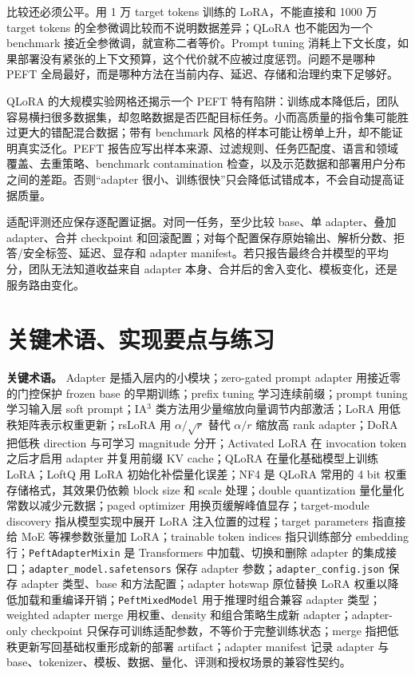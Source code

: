 \documentclass[UTF8,zihao=-4,openany]{ctexbook}
\begin{document}
比较还必须公平。用 1 万 target tokens 训练的 LoRA，不能直接和 1000 万 target tokens 的全参微调比较而不说明数据差异；QLoRA 也不能因为一个 benchmark 接近全参微调，就宣称二者等价。Prompt tuning 消耗上下文长度，如果部署没有紧张的上下文预算，这个代价就不应被过度惩罚。问题不是哪种 PEFT 全局最好，而是哪种方法在当前内存、延迟、存储和治理约束下足够好。

QLoRA 的大规模实验网格还揭示一个 PEFT 特有陷阱：训练成本降低后，团队容易横扫很多数据集，却忽略数据是否匹配目标任务。小而高质量的指令集可能胜过更大的错配混合数据；带有 benchmark 风格的样本可能让榜单上升，却不能证明真实泛化。PEFT 报告应写出样本来源、过滤规则、任务匹配度、语言和领域覆盖、去重策略、benchmark contamination 检查，以及示范数据和部署用户分布之间的差距。否则“adapter 很小、训练很快”只会降低试错成本，不会自动提高证据质量。

适配评测还应保存逐配置证据。对同一任务，至少比较 base、单 adapter、叠加 adapter、合并 checkpoint 和回滚配置；对每个配置保存原始输出、解析分数、拒答/安全标签、延迟、显存和 adapter manifest。若只报告最终合并模型的平均分，团队无法知道收益来自 adapter 本身、合并后的舍入变化、模板变化，还是服务路由变化。

\section{关键术语、实现要点与练习}
\textbf{关键术语。} Adapter 是插入层内的小模块；zero-gated prompt adapter 用接近零的门控保护 frozen base 的早期训练；prefix tuning 学习连续前缀；prompt tuning 学习输入层 soft prompt；IA$^3$ 类方法用少量缩放向量调节内部激活；LoRA 用低秩矩阵表示权重更新；rsLoRA 用 $\alpha/\sqrt r$ 替代 $\alpha/r$ 缩放高 rank adapter；DoRA 把低秩 direction 与可学习 magnitude 分开；Activated LoRA 在 invocation token 之后才启用 adapter 并复用前缀 KV cache；QLoRA 在量化基础模型上训练 LoRA；LoftQ 用 LoRA 初始化补偿量化误差；NF4 是 QLoRA 常用的 4 bit 权重存储格式，其效果仍依赖 block size 和 scale 处理；double quantization 量化量化常数以减少元数据；paged optimizer 用换页缓解峰值显存；target-module discovery 指从模型实现中展开 LoRA 注入位置的过程；target parameters 指直接给 MoE 等裸参数张量加 LoRA；trainable token indices 指只训练部分 embedding 行；\texttt{PeftAdapterMixin} 是 Transformers 中加载、切换和删除 adapter 的集成接口；\texttt{adapter\_model.safetensors} 保存 adapter 参数；\texttt{adapter\_config.json} 保存 adapter 类型、base 和方法配置；adapter hotswap 原位替换 LoRA 权重以降低加载和重编译开销；\texttt{PeftMixedModel} 用于推理时组合兼容 adapter 类型；weighted adapter merge 用权重、density 和组合策略生成新 adapter；adapter-only checkpoint 只保存可训练适配参数，不等价于完整训练状态；merge 指把低秩更新写回基础权重形成新的部署 artifact；adapter manifest 记录 adapter 与 base、tokenizer、模板、数据、量化、评测和授权场景的兼容性契约。
\end{document}
